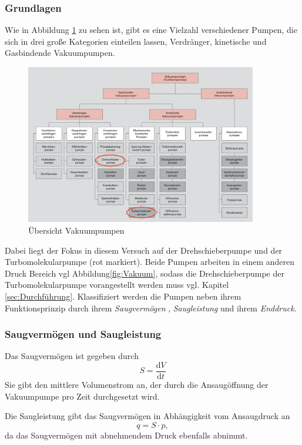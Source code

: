 \subsubsection{Grundlagen}
Wie in Abbildung \ref{fig:pumpen} zu sehen ist, gibt es eine Vielzahl verschiedener Pumpen,
die sich in drei große Kategorien einteilen lassen,
Verdränger, kinetische und Gasbindende Vakuumpumpen.
\begin{figure}[h]
    \centering
    \includegraphics[width=0.9\textwidth]{abb/pumpen.png}
    \caption{Übersicht Vakuumpumpen\cite{Pfeifer}} 
    \label{fig:pumpen}
\end{figure} 
Dabei liegt der Fokus in diesem Versuch auf der Drehschieberpumpe und der Turbomolekularpumpe (rot markiert).
Beide Pumpen arbeiten in einem anderen Druck Bereich vgl Abbildung\eqref{fig:Vakuum}, 
sodass die Drehschieberpumpe der Turbomolekularpumpe vorangestellt werden muss vgl. Kapitel \ref{sec:Durchführung}.
Klassifiziert werden die Pumpen neben ihrem Funktionsprinzip durch ihrem \textit{Saugvermögen} ,
\textit{Saugleistung} und ihrem \textit{Enddruck}.

\subsubsection*{Saugvermögen und Saugleistung}
Das Saugvermögen ist gegeben durch 
\begin{equation}
    S =\frac{\text{d}V}{\text{d}t}
\end{equation}
Sie gibt den mittlere Volumenstrom an,
der durch die Ansaugöffnung der Vakuumpumpe pro Zeit durchgesetzt wird.

Die Saugleistung gibt das Saugvermögen in Abhängigkeit vom Ansaugdruck an
\begin{equation}
    q = S\cdot p,
\end{equation}
da das Saugvermögen mit abnehmendem Druck ebenfalls abnimmt.

